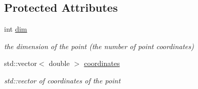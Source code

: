 \subsection*{Protected Attributes}
\begin{DoxyCompactItemize}
\item 
\mbox{\label{classv_point_a01b26d19fd50e476447da555d6160bce}} 
int \hyperlink{classv_point_a01b26d19fd50e476447da555d6160bce}{dim}
\begin{DoxyCompactList}\small\item\em the dimension of the point (the number of point coordinates) \end{DoxyCompactList}\item 
\mbox{\label{classv_point_a1bdcc85eb8914850b0c5e10aa97516de}} 
std\+::vector$<$ double $>$ \hyperlink{classv_point_a1bdcc85eb8914850b0c5e10aa97516de}{coordinates}
\begin{DoxyCompactList}\small\item\em std\+::vector of coordinates of the point \end{DoxyCompactList}\end{DoxyCompactItemize}

